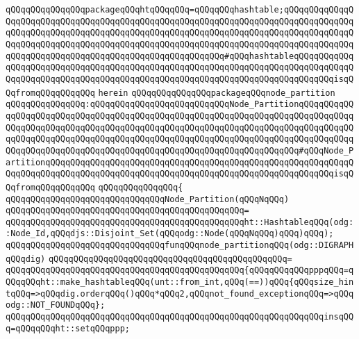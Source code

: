 \verb|qQQqqQQqqQQqqQQqpackageqQQqhtqQQqqQQq=qQQqqQQqhashtable;qQQqqQQqqQQqqQQqqQQqqQQqqQQqqQQqqQQqqQQqqQQqqQQqqQQqqQQqqQQqqQQqqQQqqQQqqQQqqQQqqQQqqQQqqQQqqQQqqQQqqQQqqQQqqQQqqQQqqQQqqQQqqQQqqQQqqQQqqQQqqQQqqQQqqQQqqQQqqQQqqQQqqQQqqQQqqQQqqQQqqQQqqQQqqQQqqQQqqQQqqQQqqQQqqQQqqQQqqQQqqQQqqQQqqQQqqQQqqQQqqQQqqQQqqQQqqQQqqQQqqQQqqQQq#qQQqhashtableqQQqqQQqqQQqqQQqqQQqqQQqqQQqqQQqqQQqqQQqqQQqqQQqqQQqqQQqqQQqqQQqqQQqqQQqqQQqqQQqqQQqqQQqqQQqqQQqqQQqqQQqqQQqqQQqqQQqqQQqqQQqqQQqqQQqqQQqqQQqqQQqqQQqisqQQqfromqQQqqQQqqQQq|\newline
\verb|herein|\newline
\newline
\verb|qQQqqQQqqQQqqQQqpackageqQQqnode_partition|\newline
\verb|qQQqqQQqqQQqqQQq:qQQqqQQqqQQqqQQqqQQqqQQqqQQqNode_PartitionqQQqqQQqqQQqqQQqqQQqqQQqqQQqqQQqqQQqqQQqqQQqqQQqqQQqqQQqqQQqqQQqqQQqqQQqqQQqqQQqqQQqqQQqqQQqqQQqqQQqqQQqqQQqqQQqqQQqqQQqqQQqqQQqqQQqqQQqqQQqqQQqqQQqqQQqqQQqqQQqqQQqqQQqqQQqqQQqqQQqqQQqqQQqqQQqqQQqqQQqqQQqqQQqqQQqqQQqqQQqqQQqqQQqqQQqqQQqqQQqqQQqqQQqqQQqqQQqqQQqqQQqqQQqqQQqqQQqqQQq#qQQqNode_PartitionqQQqqQQqqQQqqQQqqQQqqQQqqQQqqQQqqQQqqQQqqQQqqQQqqQQqqQQqqQQqqQQqqQQqqQQqqQQqqQQqqQQqqQQqqQQqqQQqqQQqqQQqqQQqqQQqqQQqqQQqqQQqqQQqisqQQqfromqQQqqQQqqQQq|\newline
\verb|qQQqqQQqqQQqqQQq{|\newline
\verb|qQQqqQQqqQQqqQQqqQQqqQQqqQQqqQQqNode_Partition(qQQqNqQQq)|\newline
\verb|qQQqqQQqqQQqqQQqqQQqqQQqqQQqqQQqqQQqqQQqqQQqqQQq=|\newline
\verb|qQQqqQQqqQQqqQQqqQQqqQQqqQQqqQQqqQQqqQQqqQQqqQQqht::HashtableqQQq(odg::Node_Id,qQQqdjs::Disjoint_Set(qQQqodg::Node(qQQqNqQQq)qQQq)qQQq);|\newline
\newline
\verb|qQQqqQQqqQQqqQQqqQQqqQQqqQQqqQQqfunqQQqnode_partitionqQQq(odg::DIGRAPHqQQqdig)|\newline
\verb|qQQqqQQqqQQqqQQqqQQqqQQqqQQqqQQqqQQqqQQqqQQqqQQq=|\newline
\verb|qQQqqQQqqQQqqQQqqQQqqQQqqQQqqQQqqQQqqQQqqQQqqQQq{qQQqqQQqqQQqpppqQQq=qQQqqQQqht::make_hashtableqQQq(unt::from_int,qQQq(==))qQQq{qQQqsize_hintqQQq=>qQQqdig.orderqQQq()qQQq*qQQq2,qQQqnot_found_exceptionqQQq=>qQQqodg::NOT_FOUNDqQQq};|\newline
\verb|qQQqqQQqqQQqqQQqqQQqqQQqqQQqqQQqqQQqqQQqqQQqqQQqqQQqqQQqqQQqqQQqinsqQQq=qQQqqQQqht::setqQQqppp;|\newline

